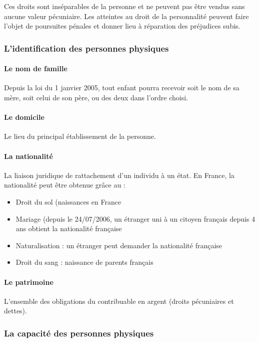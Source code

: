 \documentclass[11pt]{article}
\begin{document}
				Ces droits sont inséparables de la personne et ne peuvent pas être vendus sans aucune valeur pécuniaire. Les atteintes au droit de la personnalité peuvent faire l'objet de poursuites pénales et donner lieu à réparation des préjudices subis.
				
			\subsubsection{L'identification des personnes physiques}
				\paragraph{Le nom de famille} Depuis la loi du 1 janvier 2005, tout enfant pourra recevoir soit le nom de sa mère, soit celui de son père, ou des deux dans l'ordre choisi.
				
				\paragraph{Le domicile} Le lieu du principal établissement de la personne.
				
				\paragraph{La nationalité} La liaison juridique de rattachement d'un individu à un état. En France, la nationalité peut être obtenue grâce au :
					\begin{itemize}
						\item Droit du sol (naissances en France
						\item Mariage (depuis le 24/07/2006, un étranger uni à un citoyen français depuis 4 ans obtient la nationalité française
						\item Naturalisation : un étranger peut demander la nationalité française
						\item Droit du sang : naissance de parents français
					\end{itemize}
					
				\paragraph{Le patrimoine} L'ensemble des obligations du contribuable en argent (droits pécuniaires et dettes).
			
			\subsubsection{La capacité des personnes physiques}
\end{document}
